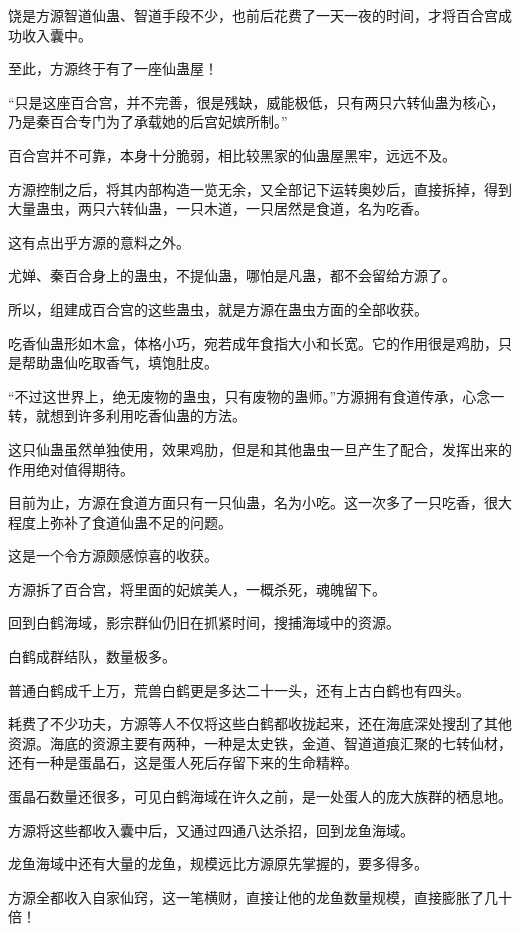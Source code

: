\begin{this_body}
饶是方源智道仙蛊、智道手段不少，也前后花费了一天一夜的时间，才将百合宫成功收入囊中。

至此，方源终于有了一座仙蛊屋！

“只是这座百合宫，并不完善，很是残缺，威能极低，只有两只六转仙蛊为核心，乃是秦百合专门为了承载她的后宫妃嫔所制。”

百合宫并不可靠，本身十分脆弱，相比较黑家的仙蛊屋黑牢，远远不及。

方源控制之后，将其内部构造一览无余，又全部记下运转奥妙后，直接拆掉，得到大量蛊虫，两只六转仙蛊，一只木道，一只居然是食道，名为吃香。

这有点出乎方源的意料之外。

尤婵、秦百合身上的蛊虫，不提仙蛊，哪怕是凡蛊，都不会留给方源了。

所以，组建成百合宫的这些蛊虫，就是方源在蛊虫方面的全部收获。

吃香仙蛊形如木盒，体格小巧，宛若成年食指大小和长宽。它的作用很是鸡肋，只是帮助蛊仙吃取香气，填饱肚皮。

“不过这世界上，绝无废物的蛊虫，只有废物的蛊师。”方源拥有食道传承，心念一转，就想到许多利用吃香仙蛊的方法。

这只仙蛊虽然单独使用，效果鸡肋，但是和其他蛊虫一旦产生了配合，发挥出来的作用绝对值得期待。

目前为止，方源在食道方面只有一只仙蛊，名为小吃。这一次多了一只吃香，很大程度上弥补了食道仙蛊不足的问题。

这是一个令方源颇感惊喜的收获。

方源拆了百合宫，将里面的妃嫔美人，一概杀死，魂魄留下。

回到白鹤海域，影宗群仙仍旧在抓紧时间，搜捕海域中的资源。

白鹤成群结队，数量极多。

普通白鹤成千上万，荒兽白鹤更是多达二十一头，还有上古白鹤也有四头。

耗费了不少功夫，方源等人不仅将这些白鹤都收拢起来，还在海底深处搜刮了其他资源。海底的资源主要有两种，一种是太史铁，金道、智道道痕汇聚的七转仙材，还有一种是蛋晶石，这是蛋人死后存留下来的生命精粹。

蛋晶石数量还很多，可见白鹤海域在许久之前，是一处蛋人的庞大族群的栖息地。

方源将这些都收入囊中后，又通过四通八达杀招，回到龙鱼海域。

龙鱼海域中还有大量的龙鱼，规模远比方源原先掌握的，要多得多。

方源全都收入自家仙窍，这一笔横财，直接让他的龙鱼数量规模，直接膨胀了几十倍！


\end{this_body}

